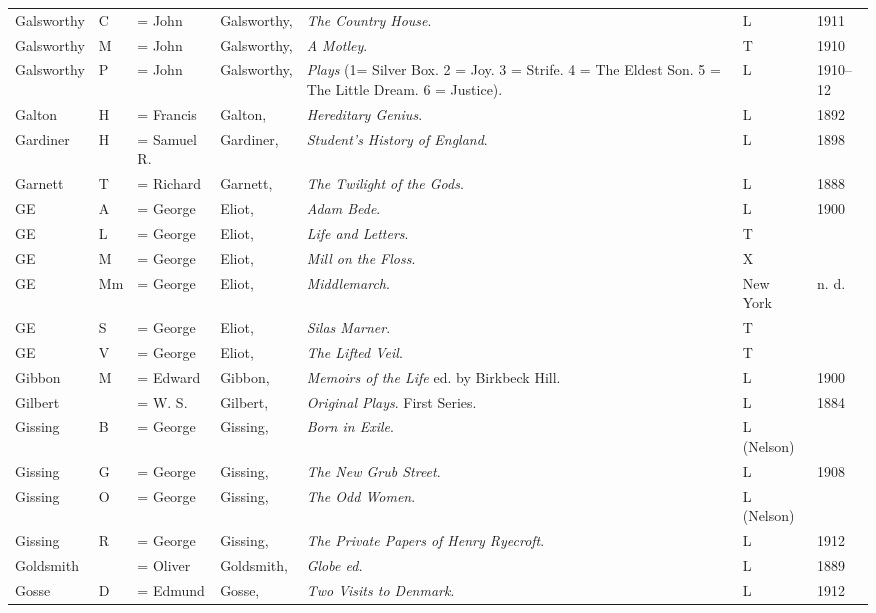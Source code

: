 \begin{sidewaystable}
\centering\small
\begin{tabular}{p{} p{} p{} p{} p{} p{} p{}}
Galsworthy & C & = John & Galsworthy, & \textit{The Country House}. & L & 1911 \\
Galsworthy & M & = John & Galsworthy, & \textit{A Motley}. & T & 1910 \\
Galsworthy & P & = John & Galsworthy, & \textit{Plays} (1= Silver Box. 2 = Joy. 3 = Strife. 4 = The Eldest Son. 5 = The Little Dream. 6 = Justice). & L & 1910--12 \\
Galton & H & = Francis & Galton, & \textit{Hereditary Genius}. & L & 1892 \\
Gardiner & H & = Samuel R. & Gardiner, & \textit{Student's History of England}. & L & 1898 \\
Garnett & T & = Richard & Garnett, & \textit{The Twilight of the Gods}. & L & 1888 \\
GE & A & = George & Eliot, & \textit{Adam Bede}. & L & 1900 \\
GE & L & = George & Eliot, & \textit{Life and Letters}. & T & \\
GE & M & = George & Eliot, & \textit{Mill on the Floss}. & X & \\
GE & Mm & = George & Eliot, & \textit{Middlemarch}. & New York & n. d. \\
GE & S & = George & Eliot, & \textit{Silas Marner}. & T & \\
GE & V & = George & Eliot, & \textit{The Lifted Veil}. & T & \\
Gibbon & M & = Edward & Gibbon, & \textit{Memoirs of the Life} ed. by Birkbeck Hill. & L & 1900 \\
Gilbert & & = W. S. & Gilbert, & \textit{Original Plays}. First Series. & L & 1884 \\
Gissing & B & = George & Gissing, & \textit{Born in Exile}. & L (Nelson) & \\
Gissing & G & = George & Gissing, & \textit{The New Grub Street}. & L & 1908 \\
Gissing & O & = George & Gissing, & \textit{The Odd Women}. & L (Nelson) &  \\
Gissing & R & = George & Gissing, & \textit{The Private Papers of Henry Ryecroft}. & L & 1912 \\
Goldsmith & & = Oliver & Goldsmith, & \textit{Globe ed.} & L & 1889 \\
Gosse & D & = Edmund & Gosse, & \textit{Two Visits to Denmark}. & L & 1912 \\

\end{tabular}
\end{sidewaystable}
